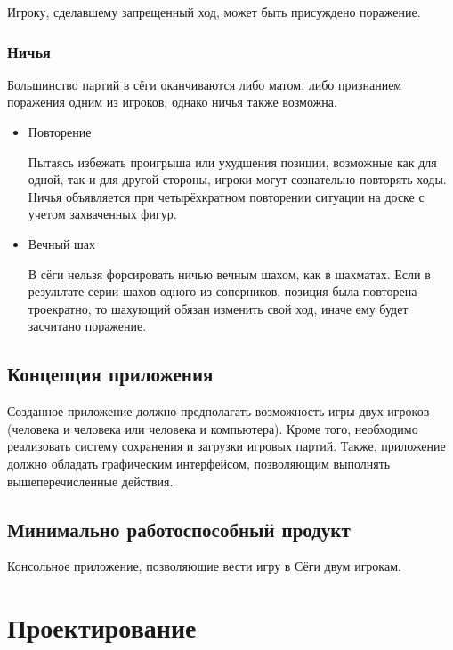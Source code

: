 Игроку, сделавшему запрещенный ход, может быть присуждено поражение.

\subsubsection{Ничья}

Большинство партий в сёги оканчиваются либо матом, либо признанием поражения одним из игроков, однако ничья также возможна.

\begin{itemize}


	\item Повторение
	
	Пытаясь избежать проигрыша или ухудшения позиции, возможные как для одной, так и для 		другой стороны, игроки могут сознательно повторять ходы. Ничья объявляется при 				четырёхкратном повторении ситуации на доске с учетом захваченных фигур.


	\item Вечный шах

	В сёги нельзя форсировать ничью вечным шахом, как в шахматах. Если в результате серии 		шахов одного из соперников, позиция была повторена троекратно, то шахующий обязан 			изменить свой ход, иначе ему будет засчитано поражение.
   
\end{itemize}

\subsection{Концепция приложения} 

Созданное приложение должно предполагать возможность игры двух игроков (человека и человека или человека и компьютера). Кроме того, необходимо реализовать систему сохранения и загрузки игровых партий. Также, приложение должно обладать графическим интерфейсом, позволяющим выполнять вышеперечисленные действия.

\subsection{Минимально работоспособный продукт}

Консольное приложение, позволяющие вести игру в Сёги двум игрокам.

\section{Проектирование}


